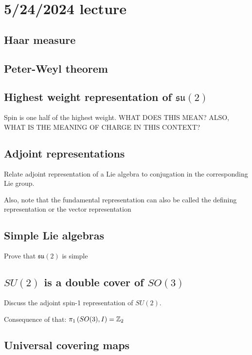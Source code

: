 \documentclass[class=article, crop=false]{standalone}
\begin{document}
\section{5/24/2024 lecture}
\subsection{Haar measure}
\subsection{Peter-Weyl theorem}
\subsection{Highest weight representation of $\mathfrak{su}(2)$}
Spin is one half of the highest weight. WHAT DOES THIS MEAN? ALSO, WHAT IS THE MEANING OF CHARGE IN THIS CONTEXT?
\subsection{Adjoint representations}
Relate adjoint representation of a Lie algebra to conjugation in the corresponding Lie group.
\par
Also, note that the fundamental representation can also be called the defining representation or the vector representation
\subsection{Simple Lie algebras}
Prove that $\mathfrak{su}(2)$ is simple
\subsection{$SU(2)$ is a double cover of $SO(3)$}
Discuss the adjoint spin-1 representation of $SU(2)$.
\par
Consequence of that: $\pi_1 \left( SO(3), I \right) = \mathbb{Z}_2$
\subsection{Universal covering maps}
\end{document}
